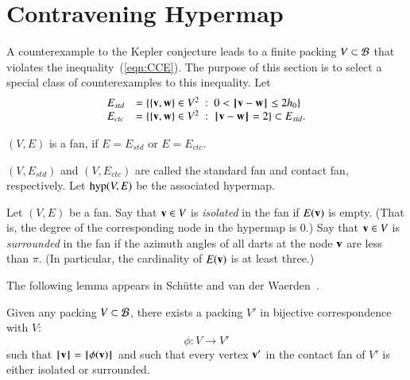 \section{Contravening Hypermap}

%
A counterexample to the Kepler conjecture leads to a finite packing $V\subset {\mathcal B}$ that violates the inequality~(\ref{eqn:CCE}).
 The purpose of this section is to select a special class of counterexamples to this inequality.
Let
\begin{equation}\label{eqn:fan-edge}
\begin{array}{lll}
 E_{std} &= \{\{{\mathbf v},{\mathbf w}\}\in V^2\ :\  0 < {\hskip0.1em|\hskip-0.15em|\hskip0.1em}{\mathbf v} - {\mathbf w}{\hskip0.1em|\hskip-0.15em|\hskip0.1em}\le 2{h_0} \}\\
 E_{ctc} &= \{\{{\mathbf v},{\mathbf w}\}\in V^2\ :\  {\hskip0.1em|\hskip-0.15em|\hskip0.1em}{\mathbf v} - {\mathbf w}{\hskip0.1em|\hskip-0.15em|\hskip0.1em}= 2 \}\subset E_{std}.
\end{array}
\end{equation}

\begin{lemma}
$(V,E)$ is a fan, if $E=E_{std}$ or $E=E_{ctc}$.
\end{lemma}
$(V,E_{std})$ and $(V,E_{ctc})$ are called the standard fan and contact fan, respectively.
Let ${\operatorname{hyp}}(V,E)$ be the associated hypermap.
%
%
%
%
%
%
%

\begin{definition}
Let $(V,E)$ be a fan.
Say that ${\mathbf v}\in V$ is {\it isolated} in the fan if $E({\mathbf v})$ is empty.
(That is, the degree of the corresponding node in the hypermap is $0$.) Say that ${\mathbf v}\in V$ is {\it surrounded} in the fan if the azimuth angles of all darts at the node ${\mathbf v}$ are less than $\pi$.  (In particular, the cardinality of $E({\mathbf v})$ is at least three.)
\end{definition}
%
%
%
%
%
%

The following lemma appears in Sch\"utte and van der Waerden~\cite{vanderWaerden:1951}.

\begin{lemma}
Given any packing $V\subset {\mathcal B}$,
there exists a  packing $V'$ 
in bijective correspondence with $V$:
$$
\phi:V\to V'
$$
such that ${{\hskip0.1em|\hskip-0.15em|\hskip0.1em}{\mathbf v}{\hskip0.1em|\hskip-0.15em|\hskip0.1em}} = {{\hskip0.1em|\hskip-0.15em|\hskip0.1em}\phi({\mathbf v}){\hskip0.1em|\hskip-0.15em|\hskip0.1em}}$ and
such that every vertex ${\mathbf v}'$ in the contact fan of $V'$
is either isolated or surrounded.
\end{lemma}
%
%
%

